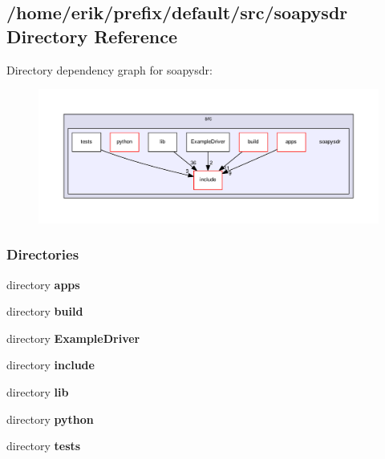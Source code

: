\subsection{/home/erik/prefix/default/src/soapysdr Directory Reference}
\label{dir_5fdd47fbc85b9dbc92cc4d63488a34f7}
Directory dependency graph for soapysdr\+:
\nopagebreak
\begin{figure}[H]
\begin{center}
\leavevmode
\includegraphics[width=350pt]{dir_5fdd47fbc85b9dbc92cc4d63488a34f7_dep}
\end{center}
\end{figure}
\subsubsection*{Directories}
\begin{DoxyCompactItemize}
\item 
directory {\bf apps}
\item 
directory {\bf build}
\item 
directory {\bf Example\+Driver}
\item 
directory {\bf include}
\item 
directory {\bf lib}
\item 
directory {\bf python}
\item 
directory {\bf tests}
\end{DoxyCompactItemize}
